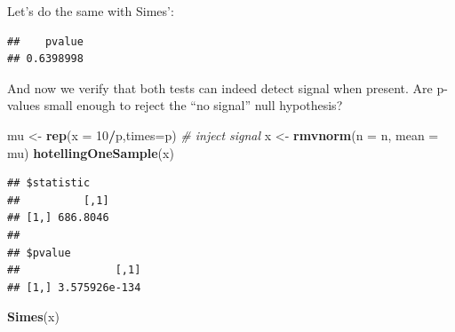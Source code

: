 \documentclass[]{book}
\newenvironment{Shaded}{\begin{snugshade}}{\end{snugshade}}
\newcommand{\KeywordTok}[1]{\textcolor[rgb]{0.13,0.29,0.53}{\textbf{#1}}}
\newcommand{\DataTypeTok}[1]{\textcolor[rgb]{0.13,0.29,0.53}{#1}}
\newcommand{\DecValTok}[1]{\textcolor[rgb]{0.00,0.00,0.81}{#1}}
\newcommand{\StringTok}[1]{\textcolor[rgb]{0.31,0.60,0.02}{#1}}
\newcommand{\CommentTok}[1]{\textcolor[rgb]{0.56,0.35,0.01}{\textit{#1}}}
\newcommand{\ControlFlowTok}[1]{\textcolor[rgb]{0.13,0.29,0.53}{\textbf{#1}}}
\newcommand{\OperatorTok}[1]{\textcolor[rgb]{0.81,0.36,0.00}{\textbf{#1}}}
\newcommand{\NormalTok}[1]{#1}
\theoremstyle{definition}
\theoremstyle{definition}
\theoremstyle{definition}
\theoremstyle{remark}
\begin{document}
Let's do the same with Simes':

\begin{Shaded}
\end{Shaded}

\begin{verbatim}
##    pvalue 
## 0.6398998
\end{verbatim}

And now we verify that both tests can indeed detect signal when present.
Are p-values small enough to reject the ``no signal'' null hypothesis?

\begin{Shaded}
\begin{Highlighting}[]
\NormalTok{mu <-}\StringTok{ }\KeywordTok{rep}\NormalTok{(}\DataTypeTok{x =} \DecValTok{10}\OperatorTok{/}\NormalTok{p,}\DataTypeTok{times=}\NormalTok{p) }\CommentTok{# inject signal}
\NormalTok{x <-}\StringTok{ }\KeywordTok{rmvnorm}\NormalTok{(}\DataTypeTok{n =}\NormalTok{ n, }\DataTypeTok{mean =}\NormalTok{ mu)}
\KeywordTok{hotellingOneSample}\NormalTok{(x)}
\end{Highlighting}
\end{Shaded}

\begin{verbatim}
## $statistic
##          [,1]
## [1,] 686.8046
## 
## $pvalue
##               [,1]
## [1,] 3.575926e-134
\end{verbatim}

\begin{Shaded}
\begin{Highlighting}[]
\KeywordTok{Simes}\NormalTok{(x)}
\end{Highlighting}
\end{Shaded}
\end{document}
